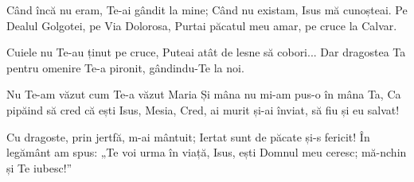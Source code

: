 \beginverse
Când încă nu eram, Te-ai gândit la mine;
Când nu existam, Isus mă cunoșteai.
Pe Dealul Golgotei, pe Via Dolorosa,
Purtai păcatul meu amar, pe cruce la Calvar.
\endverse

\beginchorus
Cuiele nu Te-au ținut pe cruce,
Puteai atât de lesne să cobori...
Dar dragostea Ta pentru omenire
Te-a pironit, gândindu-Te la noi.
\endchorus

\beginverse
Nu Te-am văzut cum Te-a văzut Maria
Și mâna nu mi-am pus-o în mâna Ta,
Ca pipăind să cred că ești Isus, Mesia,
Cred, ai murit și-ai înviat, să fiu și eu salvat!
\endverse

\beginverse
Cu dragoste, prin jertfă, m-ai mântuit;
Iertat sunt de păcate și-s fericit!
În legământ am spus: „Te voi urma în viață,
Isus, ești Domnul meu ceresc; mă-nchin și Te iubesc!”
\endverse
\endsong